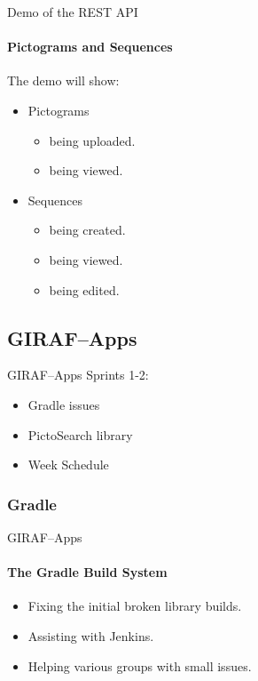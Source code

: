         \begin{frame}[t]{Demo of the REST API}\framesubtitle{Pictograms and Sequences}
            The demo will show:
            \begin{itemize}
                \item Pictograms
                \begin{itemize}
                    \item being uploaded.
                    \item being viewed.
                \end{itemize}
                \item Sequences
                \begin{itemize}
                    \item being created.
                    \item being viewed.
                    \item being edited.
                \end{itemize}
            \end{itemize}
        \end{frame}

    \subsection{GIRAF--Apps}
        \begin{frame}[t]{GIRAF--Apps}
            Sprints 1-2:
            \begin{itemize}
                \item Gradle issues
                \item PictoSearch library
                \item Week Schedule
            \end{itemize}
        \end{frame}


        \subsubsection{Gradle}
            \begin{frame}[t]{GIRAF--Apps}\framesubtitle{The Gradle Build System}
                \begin{itemize}
                    \item Fixing the initial broken library builds.
                    \item Assisting with Jenkins.
                    \item Helping various groups with small issues.
                \end{itemize}
            \end{frame}

